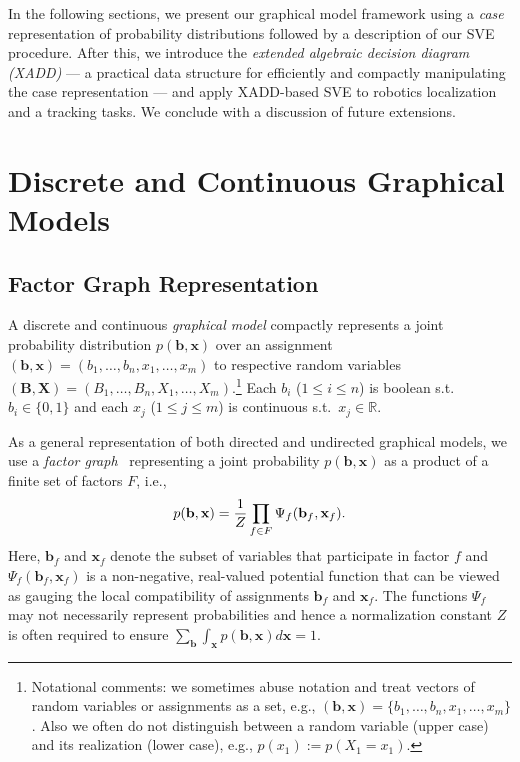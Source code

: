\documentclass[letterpaper]{article}
\newcommand{\R}{\mathbb{R}}
\renewcommand{\vec}[1]{\mathbf{#1}}
\begin{document}
In the following sections, we present our graphical model
framework using a \emph{case} representation of probability
distributions followed by a description of our SVE procedure.  
After this, we introduce
the \emph{extended algebraic decision diagram (XADD)} --- a practical
data structure for efficiently and compactly manipulating the case
representation --- and apply XADD-based SVE to robotics localization 
and a tracking tasks.  We conclude with a discussion of future 
extensions.

\section{Discrete and Continuous Graphical Models}

\subsection{Factor Graph Representation}

A discrete and continuous \emph{graphical model} compactly represents
a joint probability distribution $p(\vec{b},\vec{x})$ over an
assignment $(\vec{b},\vec{x}) = ( b_1,\ldots,b_n,x_{1},\ldots,x_m )$
to respective random variables $(\vec{B},\vec{X}) =
(B_1,\ldots,B_n,X_{1},\ldots,X_m )$.\footnote{Notational comments:
we sometimes abuse notation and treat
vectors of random variables or assignments as a set, e.g., 
$(\vec{b},\vec{x}) = \{ b_1,\ldots,b_n,x_1,\ldots,x_m \}$.  
Also we often do
not distinguish between a random variable (upper case) and its
realization (lower case), e.g., $p(x_1) := p(X_1 = x_1)$.}  Each $b_i$
($1 \leq i \leq n$) is boolean s.t.\ $b_i \in \{ 0,1 \}$ and each
$x_j$ ($1 \leq j \leq m$) is continuous s.t.\ $x_j \in \R$.

As a general representation of both directed and undirected graphical
models, we use a \emph{factor graph}~\cite{factor_graph} 
representing a joint probability $p(\vec{b},\vec{x})$ as a
product of a finite set of factors $F$, i.e.,
\vspace{-2mm}
{\footnotesize
\begin{equation}
p(\vec{b},\vec{x}) = \frac{1}{Z} \prod_{f \in F} \Psi_f(\vec{b}_f,\vec{x}_f).
\label{eq:fg}
\vspace{-1mm}
\end{equation}
}
Here, $\vec{b}_f$ and $\vec{x}_f$ denote the subset of variables that
participate in factor $f$ and $\Psi_f(\vec{b}_f,\vec{x}_f)$ is a 
non-negative, real-valued 
potential function that can be viewed as gauging the local
compatibility of assignments $\vec{b}_f$ and $\vec{x}_f$.  
The functions $\Psi_f$ may not necessarily represent probabilities and
hence a normalization constant $Z$ is often required to ensure
$\sum_{\vec{b}} \int_{\vec{x}} p(\vec{b},\vec{x}) d\vec{x} = 1$.
\end{document}
